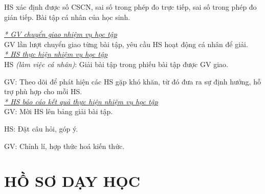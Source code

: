 {
	HS xác định được số CSCN, sai số trong phép đo trực tiếp, sai số trong phép đo gián tiếp.
}
{
	Bài tập cá nhân của học sinh.
}
{
	\textit{\underline{* GV chuyển giao nhiệm vụ học tập}}\\
	GV lần lượt chuyển giao từng bài tập, yêu cầu HS hoạt động cá nhân để giải.\\
	\textit{\underline{* HS thực hiện nhiệm vụ học tập}}\\
	HS \textit{(làm việc cá nhân)}:  Giải bài tập trong phiếu bài tập được GV giao. 
	
	GV: Theo dõi để phát hiện các HS gặp khó khăn, từ đó đưa ra sự định hướng, hỗ trợ phù hợp cho mỗi HS.\\
	\textit{\underline{* HS báo cáo kết quả thực hiện nhiệm vụ học tập}}\\
	GV: Mời HS lên bảng giải bài tập.
	
	HS: Đặt câu hỏi, góp ý.
	
	GV: Chỉnh lí, hợp thức hoá kiến thức.
}

\section{HỒ SƠ DẠY HỌC}
